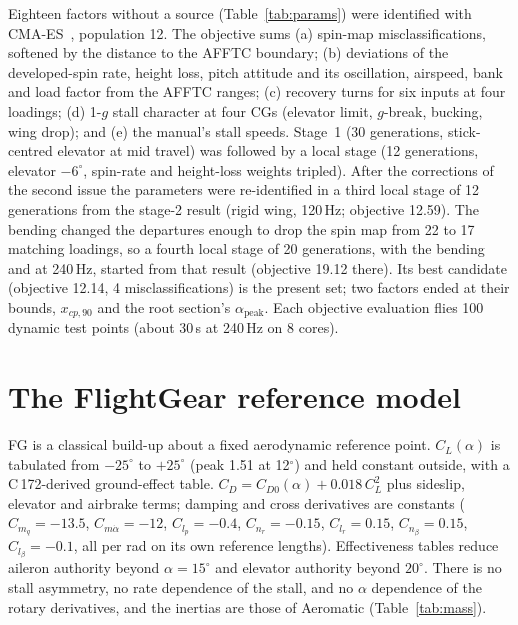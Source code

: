 \documentclass[10pt,a4paper,twocolumn]{article}
\newcommand{\Tab}[1]{}
\newcommand{\vnine}{v9}
\newcommand{\FG}{FG}
\begin{document}
Eighteen factors without a source (Table~\ref{tab:params}) were identified with CMA-ES~\cite{cma}, population 12. The objective sums
(a) spin-map misclassifications, softened by the distance to the AFFTC boundary;
(b) deviations of the developed-spin rate, height loss, pitch attitude and its oscillation, airspeed, bank and load factor from the AFFTC ranges;
(c) recovery turns for six inputs at four loadings;
(d) 1-$g$ stall character at four CGs (elevator limit, $g$-break, bucking, wing drop); and
(e) the manual's stall speeds.
Stage~1 (30 generations, stick-centred elevator at mid travel) was followed by a local stage (12 generations, elevator $-6^\circ$,
spin-rate and height-loss weights tripled). After the corrections of the second issue the parameters were re-identified in a
third local stage of 12 generations from the stage-2 result (rigid wing, 120\,Hz; objective 12.59). The bending changed the
departures enough to drop the spin map from 22 to 17 matching loadings, so a fourth local stage of 20 generations, with the bending
and at 240\,Hz, started from that result (objective 19.12 there). Its best candidate (objective 12.14, 4 misclassifications) is the
present set; two factors ended at their bounds, $x_{cp,90}$ and the root section's $\alpha_\text{peak}$. Each objective evaluation flies
100 dynamic test points (about 30\,s at 240\,Hz on 8 cores).

\begin{table}[t]
\centering\small
\caption{Identified parameters of \vnine{}: bounds and fitted values.}\label{tab:params}
\Tab{params}
\end{table}

\section{The FlightGear reference model}
\FG{} is a classical build-up about a fixed aerodynamic reference point. $C_L(\alpha)$ is tabulated from $-25^\circ$ to $+25^\circ$ (peak 1.51 at
12$^\circ$) and held constant outside, with a C\,172-derived ground-effect table. $C_D=C_{D0}(\alpha)+0.018\,C_L^2$ plus sideslip, elevator and airbrake terms; damping and
cross derivatives are constants ($C_{m_q}=-13.5$, $C_{m\dot\alpha}=-12$, $C_{l_p}=-0.4$, $C_{n_r}=-0.15$, $C_{l_r}=0.15$,
$C_{n_\beta}=0.15$, $C_{l_\beta}=-0.1$, all per rad on its own reference lengths). Effectiveness tables reduce aileron authority beyond
$\alpha=15^\circ$ and elevator authority beyond $20^\circ$. There is no stall asymmetry, no rate dependence of the stall, and no
$\alpha$ dependence of the rotary derivatives, and the inertias are those of Aeromatic (Table~\ref{tab:mass}).
\end{document}
